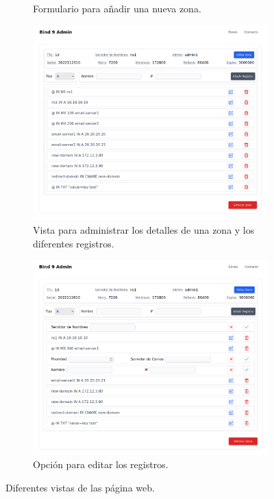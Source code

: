 \begin{figure}
\begin{subfigure}{0.49\textwidth}
        \caption{Formulario para añadir una nueva zona.}
    \end{subfigure}
    \hfill
    \begin{subfigure}{0.49\textwidth}
        \includegraphics[width=\textwidth]{Graphics/web/list-records.png}
        \caption{Vista para administrar los detalles de una zona y los diferentes registros.}
    \end{subfigure}
    \hfill
    \begin{subfigure}{0.49\textwidth}
        \includegraphics[width=\textwidth]{Graphics/web/edit-records.png}
        \caption{Opción para editar los registros.}
    \end{subfigure}

    \caption{Diferentes vistas de las página web.}
    \label{fig:web-view}
\end{figure}


